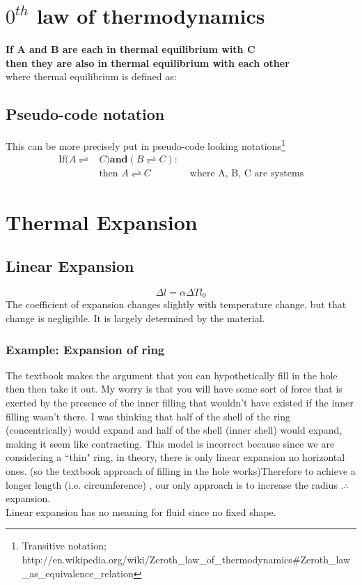\documentclass[12 pt , twoside, letterpaper] {article}
\begin{document}
 \section{$0^{th}$ law of thermodynamics}
 \textbf {If A and B are each in thermal equilibrium with C } 
\\ \textbf{      then they are also in thermal equilibrium with each other}
\\ \quad where  thermal equilibrium is defined as:
\\ \quad \quad {}
\subsection{Pseudo-code notation}
 This can be more precisely put in pseudo-code looking notations\footnote{Transitive notation; http://en.wikipedia.org/wiki/Zeroth\_law\_of\_thermodynamics\#Zeroth\_law\_as\_equivalence\_relation}
\begin{align}\text{If}(A \rightleftharpoons  & C) \textbf{and} (B \rightleftharpoons C):
\\ &\text{then } A \rightleftharpoons C \quad \quad\quad\quad  \text{where A, B, C are systems}\end{align}
\section{Thermal Expansion}
\subsection{Linear Expansion}
 $$ \Delta l =\alpha \Delta T l_0$$
The coefficient of expansion changes slightly with temperature change, but that change is negligible. It is largely determined by the material.
\subsubsection{Example: Expansion of ring}
The textbook makes the argument that you can hypothetically fill in the hole then then take it out. My worry is that you will have some sort of force that is exerted by the presence of the inner filling that wouldn't have existed if the inner filling wasn't there. I was thinking that half of the shell of the ring (concentrically) would expand and half of the shell (inner shell) would expand, making it seem like contracting. This model is incorrect because since we are considering a ``thin" ring, in theory, there is only linear expansion no horizontal ones. (so the textbook approach of filling in the hole works)Therefore to achieve a longer length (i.e. circumference) , our only approach is to increase the radius .$\therefore$ expansion. 
\\Linear expansion has no meaning for fluid since no fixed shape.
\end{document}
